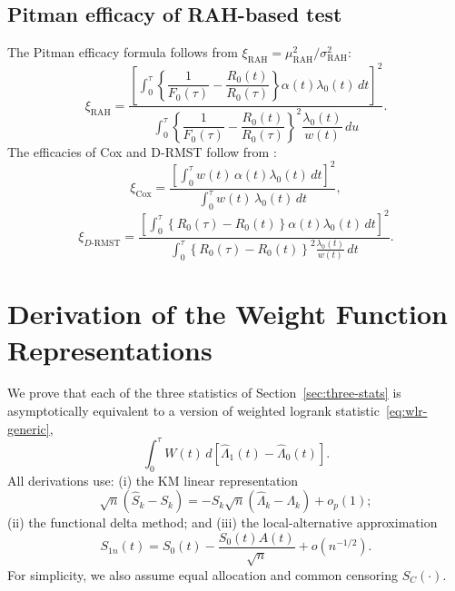 \documentclass[12pt]{article}
\newcommand{\RAH}{\mathrm{RAH}}
\newcommand{\DRMST}{D\text{-}\mathrm{RMST}}
\newcommand{\dd}{\,d}
\begin{document}
\subsection{Pitman efficacy of RAH-based test}
\label{sec:appendix-pitman}
The Pitman efficacy formula follows from $\xi_{\RAH}=\mu_{\RAH}^2/\sigma_{\RAH}^2$:
\begin{equation}\label{eq:eff-RAH}
  \xi_{\RAH}
    =\frac{\displaystyle
      \left[\int_0^\tau\!\left\{\dfrac{1}{F_0(\tau)}-\dfrac{R_0(t)}{R_0(\tau)}\right\}
            \alpha(t)\lambda_0(t)\dd t\right]^{\!2}}{
      \displaystyle
      \int_0^\tau\!\left\{\dfrac{1}{F_0(\tau)}-\dfrac{R_0(t)}{R_0(\tau)}\right\}^{\!2}
      \dfrac{\lambda_0(t)}{w(t)}\dd u}.
\end{equation}
The efficacies of Cox and D-RMST follow from \citet{Tian2018}:
\begin{equation}\label{eq:eff-Cox}
  \xi_{\mathrm{Cox}}
    =\frac{\displaystyle
       \left[\int_0^{\tau} w(t)\,\alpha(t)\lambda_0(t)\dd t\right]^2}{
      \displaystyle
       \int_0^{\tau} w(t)\,\lambda_0(t)\dd t},
\end{equation}
\begin{equation}\label{eq:eff-DRMST}
  \xi_{\DRMST}
    =\frac{\displaystyle
       \left[\int_0^{\tau}\!\left\{R_0(\tau)-R_0(t)\right\}
             \alpha(t)\lambda_0(t)\dd t\right]^2}{
      \displaystyle
       \int_0^{\tau}\!\left\{R_0(\tau)-R_0(t)\right\}^{\!2}
       \frac{\lambda_0(t)}{w(t)}\dd t}.
\end{equation}



\section{Derivation of the Weight Function Representations}
\label{sec:appendix-weights}

We prove that each of the three statistics of
Section~\ref{sec:three-stats} is asymptotically equivalent to a version of
weighted logrank statistic~\eqref{eq:wlr-generic},
$$\int_0^\tau W(t)\,d[\hat\Lambda_1(t)-\hat\Lambda_0(t)].$$
All derivations use: (i) the KM linear representation
$$\sqrt{n}(\hat S_k-S_k)=-S_k\sqrt{n}(\hat\Lambda_k-\Lambda_k)+o_p(1);$$
(ii)  the functional delta method; and
(iii) the local-alternative approximation
$$S_{1n}(t)=S_0(t)-\frac{S_0(t)A(t)}{\sqrt{n}}+o(n^{-1/2}).$$
For simplicity, we also assume equal allocation and common censoring $S_C(\cdot)$.
\end{document}
